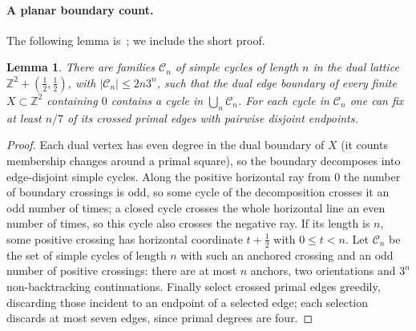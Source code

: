 \documentclass[11pt]{article}
\newtheorem{lemma}[theorem]{Lemma}
\theoremstyle{definition}
\theoremstyle{remark}
\numberwithin{equation}{section}
\newcommand{\Z}{\mathbb Z}
\newcommand{\1}{\mathbf 1}
\begin{document}
\paragraph{A planar boundary count.} The following lemma is~\cite[Lemma~3.1]{OpenAIZ3}; we include
the short proof.
\begin{lemma}\label{lem:contours}
There are families $\mathcal C_n$ of simple cycles of length $n$ in the dual lattice
$\Z^2+(\frac12,\frac12)$, with $|\mathcal C_n|\le2n3^n$, such that the dual edge boundary of every
finite $X\subset\Z^2$ containing $0$ contains a cycle in $\bigcup_n\mathcal C_n$. For each cycle in
$\mathcal C_n$ one can fix at least $n/7$ of its crossed primal edges with pairwise disjoint
endpoints.
\end{lemma}
\begin{proof}
Each dual vertex has even degree in the dual boundary of $X$ (it counts membership changes around
a primal square), so the boundary decomposes into edge-disjoint simple cycles. Along the positive
horizontal ray from $0$ the number of boundary crossings is odd, so some cycle of the decomposition
crosses it an odd number of times; a closed cycle crosses the whole horizontal line an even number
of times, so this cycle also crosses the negative ray. If its length is $n$, some positive crossing
has horizontal coordinate $t+\frac12$ with $0\le t<n$. Let $\mathcal C_n$ be the set of simple
cycles of length $n$ with such an anchored crossing and an odd number of positive crossings: there
are at most $n$ anchors, two orientations and $3^n$ non-backtracking continuations. Finally select
crossed primal edges greedily, discarding those incident to an endpoint of a selected edge; each
selection discards at most seven edges, since primal degrees are four.
\end{proof}
\end{document}
